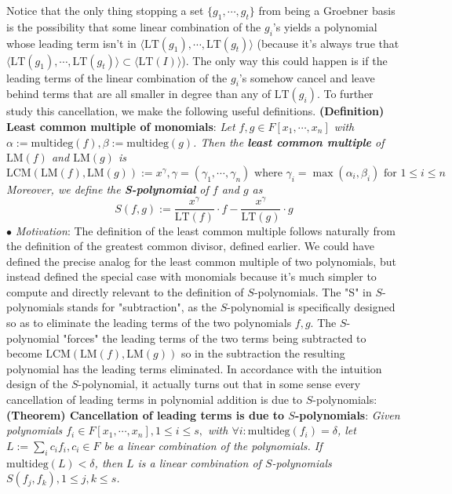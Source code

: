 \documentclass{article}
\begin{document}
\newline
Notice that the only thing stopping a set $ \{ g_1, \cdots, g_t \} $ from being a Groebner basis is the possibility that some linear combination of the $ g_i $'s yields a polynomial whose leading term isn't in $ \langle \text{LT}(g_1), \cdots, \text{LT}(g_t) \rangle $ (because it's always true that $ \langle \text{LT}(g_1), \cdots, \text{LT}(g_t) \rangle \subset \langle \text{LT}(I) \rangle $). The only way this could happen is if the leading terms of the linear combination of the $ g_i $'s somehow cancel and leave behind terms that are all smaller in degree than any of $ \text{LT}(g_i) $. To further study this cancellation, we make the following useful definitions.
\newline \newline
\textbf{(Definition) Least common multiple of monomials}: \textit{Let $ f, g \in F[x_1, \cdots, x_n] $ with $ \alpha := \text{multideg}(f), \beta := \text{multideg}(g) $. Then the \textbf{least common multiple} of $ \text{LM}(f) $ and $ \text{LM}(g) $ is}
$$ \text{LCM}(\text{LM}(f), \text{LM}(g)) := x^\gamma, \gamma = (\gamma_1, \cdots, \gamma_n) \text{ where } \gamma_i = \max(\alpha_i, \beta_i) \text{ for } 1 \leq i \leq n $$
\indent \textit{Moreover, we define the \textbf{S-polynomial} of $ f $ and $ g $ as}
$$ S(f, g) := \frac{x^\gamma}{\text{LT}(f)} \cdot f - \frac{x^\gamma}{\text{LT}(g)} \cdot g $$
\indent $ \bullet $ \textit{Motivation}: The definition of the least common multiple follows naturally from the definition of the greatest common divisor, defined earlier. We could have defined the precise analog for the least common multiple of two polynomials, but instead defined the special case with monomials because it's much simpler to compute and directly relevant to the definition of $ S $-polynomials. The "S" in $ S $-polynomials stands for "subtraction", as the $ S $-polynomial is specifically designed so as to eliminate the leading terms of the two polynomials $ f, g $. The $ S $-polynomial "forces" the leading terms of the two terms being subtracted to become $ \text{LCM}(\text{LM}(f), \text{LM}(g)) $ so in the subtraction the resulting polynomial has the leading terms eliminated.
\newline
In accordance with the intuition design of the $ S $-polynomial, it actually turns out that in some sense every cancellation of leading terms in polynomial addition is due to $ S $-polynomials:
\newline \newline
\textbf{(Theorem) Cancellation of leading terms is due to $ S $-polynomials}: \textit{Given polynomials $ f_i \in F[x_1, \cdots, x_n], 1 \leq i \leq s, $ with $ \forall i: \text{multideg}(f_i) = \delta $, let $ L := \sum_i c_i f_i, c_i \in F $ be a linear combination of the polynomials. If $ \text{multideg}(L) < \delta $, then $ L $ is a linear combination of $ S $-polynomials $ S(f_j, f_k), 1 \leq j, k \leq s $.}
\end{document}
